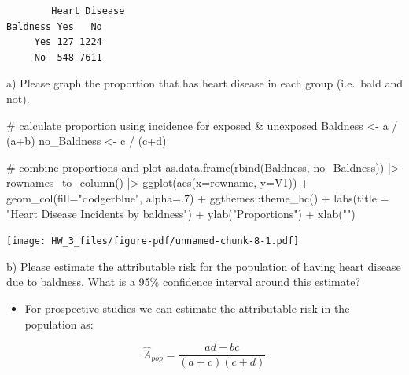 \documentclass[
  letterpaper,
  DIV=11,
  numbers=noendperiod]{scrartcl}
\newenvironment{Shaded}{\begin{snugshade}}{\end{snugshade}}
\newcommand{\AttributeTok}[1]{\textcolor[rgb]{0.40,0.45,0.13}{#1}}
\newcommand{\CommentTok}[1]{\textcolor[rgb]{0.37,0.37,0.37}{#1}}
\newcommand{\DecValTok}[1]{\textcolor[rgb]{0.68,0.00,0.00}{#1}}
\newcommand{\FunctionTok}[1]{\textcolor[rgb]{0.28,0.35,0.67}{#1}}
\newcommand{\NormalTok}[1]{\textcolor[rgb]{0.00,0.23,0.31}{#1}}
\newcommand{\OtherTok}[1]{\textcolor[rgb]{0.00,0.23,0.31}{#1}}
\newcommand{\SpecialCharTok}[1]{\textcolor[rgb]{0.37,0.37,0.37}{#1}}
\newcommand{\StringTok}[1]{\textcolor[rgb]{0.13,0.47,0.30}{#1}}
\providecommand{\tightlist}{%
  \setlength{\itemsep}{0pt}\setlength{\parskip}{0pt}}\usepackage{longtable,booktabs,array}
\begin{document}
\begin{verbatim}
        Heart Disease
Baldness Yes   No
     Yes 127 1224
     No  548 7611
\end{verbatim}

a) Please graph the proportion that has heart disease in each group
(i.e.~bald and not).

\begin{Shaded}
\begin{Highlighting}[]
\CommentTok{\# calculate proportion using incidence for exposed \& unexposed}
\NormalTok{Baldness }\OtherTok{\textless{}{-}}\NormalTok{ a }\SpecialCharTok{/}\NormalTok{ (a}\SpecialCharTok{+}\NormalTok{b)}
\NormalTok{no\_Baldness }\OtherTok{\textless{}{-}}\NormalTok{ c }\SpecialCharTok{/}\NormalTok{ (c}\SpecialCharTok{+}\NormalTok{d)}

\CommentTok{\# combine proportions and plot}
\FunctionTok{as.data.frame}\NormalTok{(}\FunctionTok{rbind}\NormalTok{(Baldness, no\_Baldness)) }\SpecialCharTok{|\textgreater{}} 
  \FunctionTok{rownames\_to\_column}\NormalTok{() }\SpecialCharTok{|\textgreater{}} 
  \FunctionTok{ggplot}\NormalTok{(}\FunctionTok{aes}\NormalTok{(}\AttributeTok{x=}\NormalTok{rowname, }\AttributeTok{y=}\NormalTok{V1)) }\SpecialCharTok{+}
  \FunctionTok{geom\_col}\NormalTok{(}\AttributeTok{fill=}\StringTok{"dodgerblue"}\NormalTok{, }\AttributeTok{alpha=}\NormalTok{.}\DecValTok{7}\NormalTok{) }\SpecialCharTok{+}
\NormalTok{  ggthemes}\SpecialCharTok{::}\FunctionTok{theme\_hc}\NormalTok{() }\SpecialCharTok{+}
  \FunctionTok{labs}\NormalTok{(}\AttributeTok{title =}  \StringTok{"Heart Disease Incidents by baldness"}\NormalTok{) }\SpecialCharTok{+}
  \FunctionTok{ylab}\NormalTok{(}\StringTok{"Proportions"}\NormalTok{) }\SpecialCharTok{+}
  \FunctionTok{xlab}\NormalTok{(}\StringTok{""}\NormalTok{) }
\end{Highlighting}
\end{Shaded}

\texttt{[image: HW\_3\_files/figure-pdf/unnamed-chunk-8-1.pdf]}

b) Please estimate the attributable risk for the population of having
heart disease due to baldness. What is a 95\% confidence interval around
this estimate?

\begin{itemize}
\tightlist
\item
  For prospective studies we can estimate the attributable risk in the
  population as:
\end{itemize}

\[
\hat{A}_{pop} = \frac{ad-bc}{(a+c)(c+d)}
\]
\end{document}
